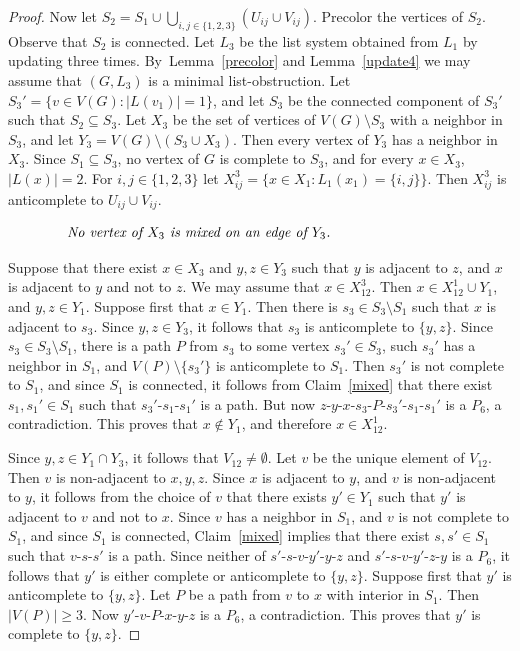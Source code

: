 \documentclass[11pt]{article}
\begin{document}
\begin{proof}
Now let $S_2 = S_1 \cup \bigcup_{i,j \in \{1,2,3\}}(U_{ij} \cup V_{ij})$.
Precolor the vertices of $S_2$.
Observe that $S_2$ is connected. Let $L_3$ be the list system obtained from 
$L_1$ by updating three times. By~Lemma~\ref{precolor} and Lemma~\ref{update4}
we may assume that $(G,L_3)$ is a minimal list-obstruction.
Let $S_3'=\{v \in V(G) : |L(v_1)|=1\}$, and let $S_3$ be the connected component
of $S_3'$ such that $S_2 \subseteq S_3$.
Let $X_3$ be the set of vertices of $V(G) \setminus S_3$ with a neighbor in $S_3$,  and
let $Y_3=V(G) \setminus (S_3 \cup X_3)$. Then every vertex of $Y_3$ has a 
neighbor in $X_3$. Since $S_1 \subseteq S_3$, no vertex of $G$ is complete to 
$S_3$, and for every $x \in X_3$, $|L(x)|=2$.
For $i,j \in \{1,2,3\}$ let $X_{ij}^3=\{x \in X_1: L_1(x_1)=\{i,j\}\}$.
Then $X^3_{ij}$ is anticomplete to $U_{ij} \cup V_{ij}$.

\begin{equation}
\label{notmixedY}
\begin{minipage}[c]{0.8 \textwidth} \em
No vertex of $X_3$ is mixed on an edge of $Y_3$.
\end{minipage}
\end{equation}

Suppose that there exist $x \in X_3$ and $y,z \in Y_3$ such that
$y$ is adjacent to $z$, and $x$ is adjacent to $y$ and not to $z$.
We may assume that $x \in X^3_{12}$. Then $x \in X^1_{12} \cup Y_1$,
and $y,z \in Y_1$.
Suppose first that $x \in Y_1$. Then there is $s_3 \in S_3 \setminus S_1$ 
such that $x$ is adjacent to $s_3$.  Since $y,z \in Y_3$, it follows that
$s_3$ is anticomplete to $\{y,z\}$. Since $s_3 \in S_3 \setminus S_1$,
there is a path $P$ from $s_3$ to some vertex $s_3' \in S_3$, such 
$s_3'$ has a neighbor in $S_1$, and $V(P) \setminus \{s_3'\}$ is anticomplete to
$S_1$. Then $s_3'$ is not complete to $S_1$, and since $S_1$ is connected,
it follows from Claim~\ref{mixed} that there exist $s_1,s_1' \in S_1$ such that
$s_3'$-$s_1$-$s_1'$ is a path. But now $z$-$y$-$x$-$s_3$-$P$-$s_3'$-$s_1$-$s_1'$ is a 
$P_6$, a contradiction. This proves that $x \not \in Y_1$, and therefore
$x \in X^1_{12}$.

Since $y,z \in Y_1 \cap Y_3$, it follows that $V_{12} \neq \emptyset$. Let
$v$ be the unique element of $V_{12}$.  Then $v$  is non-adjacent to $x,y,z$.  
Since $x$ is adjacent to $y$, and $v$ is non-adjacent to $y$, it follows
from the choice of $v$ that there exists $y' \in Y_1$ such that
$y'$ is adjacent to $v$ and not to $x$. Since $v$ has a neighbor
in $S_1$, and $v$ is not complete to $S_1$, and since $S_1$ is connected,
Claim~\ref{mixed} implies that there exist $s,s' \in S_1$ such that 
$v$-$s$-$s'$ is  a path. 
Since neither of $s'$-$s$-$v$-$y'$-$y$-$z$ and $s'$-$s$-$v$-$y'$-$z$-$y$ is a $P_6$,
it follows that $y'$ is either complete or anticomplete to $\{y,z\}$.
Suppose first that $y'$ is anticomplete to $\{y,z\}$.
Let $P$ be a path from $v$ to $x$ with interior in $S_1$.
Then $|V(P)| \geq 3$. Now $y'$-$v$-$P$-$x$-$y$-$z$ is a $P_6$, a contradiction.
This proves that $y'$ is complete to $\{y,z\}$.


\end{proof}
\end{document}
